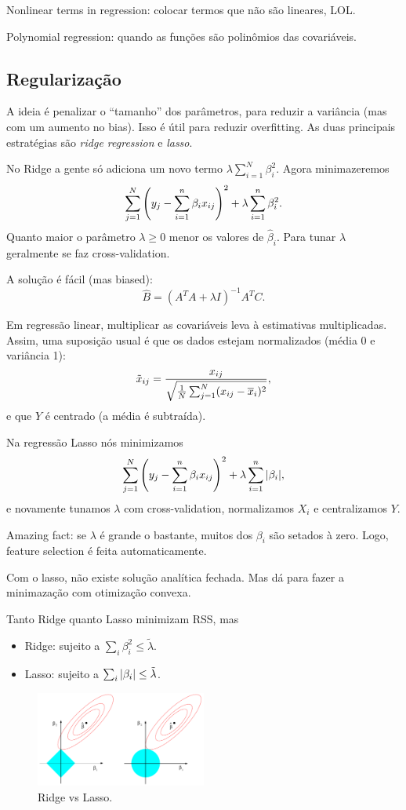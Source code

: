 \documentclass[a4paper,fleqn,12pt]{article}
\begin{document}
Nonlinear terms in regression: colocar termos que não são lineares, LOL.

Polynomial regression: quando as funções são polinômios das covariáveis.

\subsection{Regularização}

A ideia é penalizar o ``tamanho'' dos parâmetros, para reduzir a variância (mas com um aumento no bias). Isso é útil para reduzir overfitting. As duas principais estratégias são \textit{ridge regression} e \textit{lasso}.

\n

No Ridge a gente só adiciona um novo termo $\lambda \sum_{i=1}^N \beta_i^2$. Agora minimazeremos
$$
\sum_{j=1}^N \qty(y_j - \sum_{i=1}^n \beta_i x_{ij})^2 + \lambda \sum_{i=1}^n \beta_i^2.
$$
Quanto maior o parâmetro $\lambda \geq 0$ menor os valores de $\hat{\beta}_i$. Para tunar $\lambda$ geralmente se faz cross-validation.

A solução é fácil (mas biased):
$$
\hat{B} = (A^TA + \lambda I)^{-1} A^T C.
$$

Em regressão linear, multiplicar as covariáveis leva à estimativas multiplicadas. Assim, uma suposição usual é que os dados estejam normalizados (média 0 e variância 1):
$$
\tilde{x}_{ij} = \frac{x_{ij}}{\sqrt{\frac{1}{N}\sum_{j=1}^N (x_{ij} - \overline{x}_{i})^2}},
$$
e que $Y$ é centrado (a média é subtraída).

\n

Na regressão Lasso nós minimizamos
$$
\sum_{j=1}^N \qty(y_j - \sum_{i=1}^n \beta_i x_{ij})^2 + \lambda \sum_{i=1}^n \abs{\beta_i},
$$
e novamente tunamos $\lambda$ com cross-validation, normalizamos $X_i$ e centralizamos $Y$.

Amazing fact: se $\lambda$ é grande o bastante, muitos dos $\beta_i$ são setados à zero. Logo, feature selection é feita automaticamente.

Com o lasso, não existe solução analítica fechada. Mas dá para fazer a minimazação com otimização convexa.

Tanto Ridge quanto Lasso minimizam RSS, mas
\begin{itemize}
\item Ridge: sujeito a $\sum_i \beta_i^2 \leq \tilde{\lambda}$.
\item Lasso: sujeito a $\sum_i \abs{\beta_i} \leq \tilde{\lambda}$.
\end{itemize}
\begin{figure}[H]
\centering
\includegraphics[width=0.5\textwidth]{fig/ridge-lasso.png}
\caption{Ridge vs Lasso.}
\label{fig:ridge-lasso}
\end{figure}
\end{document}

